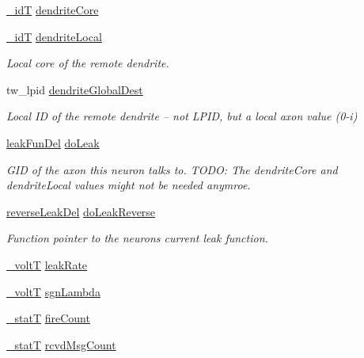 \begin{DoxyCompactItemize}
\hyperlink{assist_8h_a3f7a6e6a1210b6d9d7a42177dcb9634b}{\+\_\+id\+T} \hyperlink{structneuron_state_a62463fa4d33c39297aa5ce3a145d474f}{dendrite\+Core}
\item 
\hyperlink{assist_8h_a3f7a6e6a1210b6d9d7a42177dcb9634b}{\+\_\+id\+T} \hyperlink{structneuron_state_a73e5b16411af572181411b8fd8d5117d}{dendrite\+Local}
\begin{DoxyCompactList}\small\item\em Local core of the remote dendrite. \end{DoxyCompactList}\item 
tw\+\_\+lpid \hyperlink{structneuron_state_a4199c14c5aabfd52f441e01623bdc84c}{dendrite\+Global\+Dest}
\begin{DoxyCompactList}\small\item\em Local I\+D of the remote dendrite -- not L\+P\+I\+D, but a local axon value (0-\/i) \end{DoxyCompactList}\item 
\hyperlink{structleak_fun_del}{leak\+Fun\+Del} \hyperlink{structneuron_state_aa430f424f34dc59dc27736e27ec61320}{do\+Leak}
\begin{DoxyCompactList}\small\item\em G\+I\+D of the axon this neuron talks to. T\+O\+D\+O\+: The dendrite\+Core and dendrite\+Local values might not be needed anymroe. \end{DoxyCompactList}\item 
\hyperlink{structreverse_leak_del}{reverse\+Leak\+Del} \hyperlink{structneuron_state_af4ded7f575b64ada6c0a6664f638307c}{do\+Leak\+Reverse}
\begin{DoxyCompactList}\small\item\em Function pointer to the neuron\textquotesingle{}s current leak function. \end{DoxyCompactList}\item 
\hyperlink{assist_8h_abe1fc1b8f9efd1187e564bcb8de7f815}{\+\_\+volt\+T} \hyperlink{structneuron_state_a7138aaa7e2988e5ad0d32cc9846dcbbb}{leak\+Rate}
\item 
\hyperlink{assist_8h_abe1fc1b8f9efd1187e564bcb8de7f815}{\+\_\+volt\+T} \hyperlink{structneuron_state_a46a71f61511b5311e14643084109d90f}{sgn\+Lambda}
\item 
\hyperlink{assist_8h_ad77e6fc5a9b03d46e7c97b7c4b92e89f}{\+\_\+stat\+T} \hyperlink{structneuron_state_afe8825076c4cf3863c677307fec63c61}{fire\+Count}
\item 
\hyperlink{assist_8h_ad77e6fc5a9b03d46e7c97b7c4b92e89f}{\+\_\+stat\+T} \hyperlink{structneuron_state_ab8f63a1dfdb2992657530ff8a63fdc01}{rcvd\+Msg\+Count}

\end{DoxyCompactItemize}
